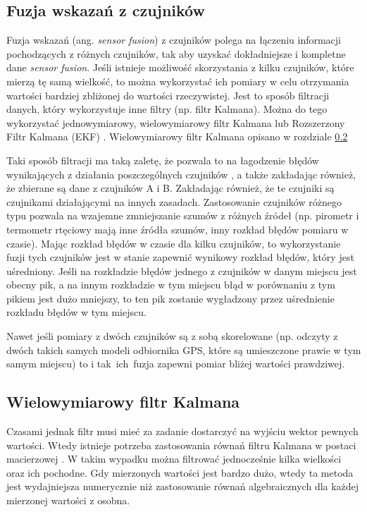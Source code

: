 {{{        
    }

    \label{fusion}
    \subsection{Fuzja wskazań z czujników}
    {
        Fuzja wskazań (ang. \textit{sensor fusion}) z czujników polega na łączeniu informacji pochodzących z różnych czujników, tak aby uzyskać dokładniejsze i kompletne dane \textit{sensor fusion}.
        Jeśli istnieje możliwość skorzystania z kilku czujników, które mierzą tę samą wielkość, to można wykorzystać ich pomiary w celu otrzymania wartości bardziej zbliżonej do wartości rzeczywistej. Jest to sposób filtracji danych, który wykorzystuje inne filtry (np. filtr Kalmana). Można do tego wykorzystać jednowymiarowy, wielowymiarowy filtr Kalmana lub Rozszerzony Filtr Kalmana (EKF) \cite{sensor_fusion}. Wielowymiarowy filtr Kalmana opisano w rozdziale \ref{multi_kalman}

        Taki sposób filtracji ma taką zaletę, że pozwala to na łagodzenie błędów wynikających z działania poszczególnych czujników \cite{sensor_fusion}, a także zakładając również, że zbierane są dane z czujników A i B. Zakładając również, że te czujniki są czujnikami działającymi na innych zasadach. Zastosowanie czujników różnego typu pozwala na wzajemne zmniejszanie szumów z różnych źródeł (np. pirometr i termometr rtęciowy mają inne źródła szumów, inny rozkład błędów pomiaru w czasie). 
        Mając rozkład błędów w czasie dla kilku czujników, to wykorzystanie fuzji tych czujników jest w stanie zapewnić wynikowy rozkład błędów, który jest uśredniony. Jeśli na rozkładzie błędów jednego z czujników w danym miejscu jest obecny pik, a na innym rozkładzie w tym miejscu błąd w porównaniu z tym pikiem jest dużo mniejszy, to ten pik zostanie wygładzony przez uśrednienie rozkładu błędów w tym miejscu.
        
        Nawet jeśli pomiary z dwóch czujników są z sobą skorelowane (np. odczyty z dwóch takich samych modeli odbiornika GPS, które są umieszczone prawie w tym samym miejscu) to i tak~ich~fuzja zapewni pomiar bliżej wartości prawdziwej.
    }

    \subsection{Wielowymiarowy filtr Kalmana}\label{multi_kalman}
    {
        Czasami jednak filtr musi mieć za zadanie dostarczyć na wyjściu wektor pewnych wartości. Wtedy istnieje potrzeba zastosowania równań filtru Kalmana w postaci macierzowej \cite{multi_kalman}. W takim wypadku można filtrować jednocześnie kilka wielkości oraz ich pochodne. Gdy mierzonych wartości jest bardzo dużo, wtedy ta metoda jest wydajniejsza numerycznie niż zastosowanie równań algebraicznych dla każdej mierzonej wartości z osobna.

}}}
